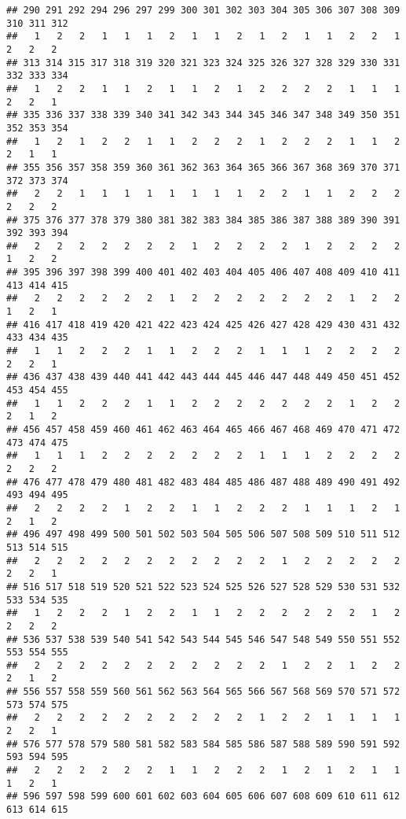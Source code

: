 \documentclass[]{article}
\begin{document}
\begin{verbatim}
## 290 291 292 294 296 297 299 300 301 302 303 304 305 306 307 308 309 310 311 312 
##   1   2   2   1   1   1   2   1   1   2   1   2   1   1   2   2   1   2   2   2 
## 313 314 315 317 318 319 320 321 323 324 325 326 327 328 329 330 331 332 333 334 
##   1   2   2   1   1   2   1   1   2   1   2   2   2   2   1   1   1   2   2   1 
## 335 336 337 338 339 340 341 342 343 344 345 346 347 348 349 350 351 352 353 354 
##   1   2   1   2   2   1   1   2   2   2   1   2   2   2   1   1   2   2   1   1 
## 355 356 357 358 359 360 361 362 363 364 365 366 367 368 369 370 371 372 373 374 
##   2   2   1   1   1   1   1   1   1   1   2   2   1   1   2   2   2   2   2   2 
## 375 376 377 378 379 380 381 382 383 384 385 386 387 388 389 390 391 392 393 394 
##   2   2   2   2   2   2   2   1   2   2   2   2   1   2   2   2   2   1   2   2 
## 395 396 397 398 399 400 401 402 403 404 405 406 407 408 409 410 411 413 414 415 
##   2   2   2   2   2   2   1   2   2   2   2   2   2   2   1   2   2   1   2   1 
## 416 417 418 419 420 421 422 423 424 425 426 427 428 429 430 431 432 433 434 435 
##   1   1   2   2   2   1   1   2   2   2   1   1   1   2   2   2   2   2   2   1 
## 436 437 438 439 440 441 442 443 444 445 446 447 448 449 450 451 452 453 454 455 
##   1   1   2   2   2   1   1   2   2   2   2   2   2   2   1   2   2   2   1   2 
## 456 457 458 459 460 461 462 463 464 465 466 467 468 469 470 471 472 473 474 475 
##   1   1   1   2   2   2   2   2   2   2   1   1   1   2   2   2   2   2   2   2 
## 476 477 478 479 480 481 482 483 484 485 486 487 488 489 490 491 492 493 494 495 
##   2   2   2   2   1   2   2   1   1   2   2   2   1   1   1   2   1   2   1   2 
## 496 497 498 499 500 501 502 503 504 505 506 507 508 509 510 511 512 513 514 515 
##   2   2   2   2   2   2   2   2   2   2   2   1   2   2   2   2   2   2   2   1 
## 516 517 518 519 520 521 522 523 524 525 526 527 528 529 530 531 532 533 534 535 
##   1   2   2   2   1   2   2   1   1   2   2   2   2   2   2   1   2   2   2   2 
## 536 537 538 539 540 541 542 543 544 545 546 547 548 549 550 551 552 553 554 555 
##   2   2   2   2   2   2   2   2   2   2   2   1   2   2   1   2   2   2   1   2 
## 556 557 558 559 560 561 562 563 564 565 566 567 568 569 570 571 572 573 574 575 
##   2   2   2   2   2   2   2   2   2   2   1   2   2   1   1   1   1   2   2   1 
## 576 577 578 579 580 581 582 583 584 585 586 587 588 589 590 591 592 593 594 595 
##   2   2   2   2   2   2   1   1   2   2   2   1   2   1   2   1   1   1   2   1 
## 596 597 598 599 600 601 602 603 604 605 606 607 608 609 610 611 612 613 614 615 

\end{verbatim}
\end{document}
